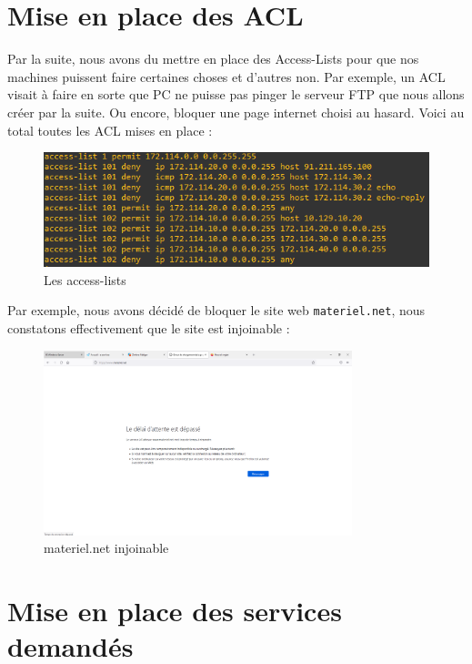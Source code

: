 \documentclass[12pt, a4paper]{article}
\begin{document}
	\section{Mise en place des ACL}

	Par la suite, nous avons du mettre en place des Access-Lists pour que nos machines puissent
	faire certaines choses et d'autres non. Par exemple, un ACL visait à faire en sorte que PC
	ne puisse pas pinger le serveur FTP que nous allons créer par la suite.  Ou encore, 
	bloquer une page internet choisi au hasard. Voici au total toutes les ACL mises en place :
	\begin{figure}[H]
		\centering
		\includegraphics[width=1\textwidth]{../screens/routeur/access-list.png}
		\caption{Les access-lists}
		\label{fig:acl}
	\end{figure}

	Par exemple, nous avons décidé de bloquer le site web \texttt{materiel.net}, nous 
	constatons effectivement que le site est injoinable :
	\begin{figure}[H]
		\centering
		\includegraphics[width=0.8\textwidth]{../screens/routeur/materiel.png}
		\caption{materiel.net injoinable}
		\label{fig:materiel}
	\end{figure}

	\section{Mise en place des services demandés}
\end{document}
